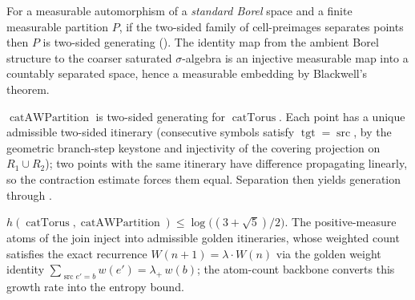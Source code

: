 \begin{theorem}\label{isGeneratingTwoSided_of_separating}
  \leanok
  For a measurable automorphism of a \emph{standard Borel} space and a finite measurable partition
  \(P\), if the two-sided family of cell-preimages separates points then \(P\) is two-sided
  generating (). The identity map from the ambient Borel structure to the
  coarser saturated \(\sigma\)-algebra is an injective measurable map into a countably separated
  space, hence a measurable embedding by Blackwell's theorem.
\end{theorem}

\begin{theorem}\label{isGeneratingTwoSided_catAWPartition}
  \leanok
  \(\operatorname{catAWPartition}\) is two-sided generating for \(\operatorname{catTorus}\). Each
  point has a unique admissible two-sided itinerary (consecutive symbols satisfy
  \(\operatorname{tgt} = \operatorname{src}\), by the geometric branch-step keystone and injectivity
  of the covering projection on \(R_1 \cup R_2\)); two points with the same itinerary have
  difference propagating linearly, so the contraction estimate forces them equal. Separation then
  yields generation through .
\end{theorem}

\begin{theorem}\label{catAW_ksEntropyPartition_le}
  \leanok
  \(h(\operatorname{catTorus}, \operatorname{catAWPartition}) \le \log\!\big((3+\sqrt5)/2\big)\). The
  positive-measure atoms of the join inject into admissible golden itineraries, whose weighted count
  satisfies the exact recurrence \(W(n+1) = \lambda\cdot W(n)\) via the golden weight identity
  \(\sum_{\operatorname{src} e' = b} w(e') = \lambda_+\,w(b)\); the atom-count backbone converts this
  growth rate into the entropy bound.
\end{theorem}

